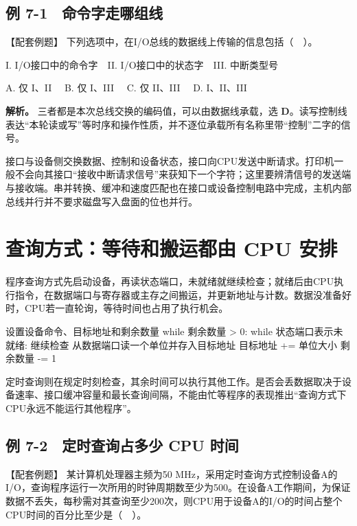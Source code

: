 \subsection{例 7-1　命令字走哪组线}\label{CO07-example-1}

【配套例题】 下列选项中，在I/O总线的数据线上传输的信息包括（　）。

I. I/O接口中的命令字　II. I/O接口中的状态字　III. 中断类型号

A. 仅 I、II　 B. 仅 I、III　 C. 仅 II、III　 D. I、II、III

\textbf{解析。} 三者都是本次总线交换的编码值，可以由数据线承载，选 \textbf{D}。读写控制线表达``本轮读或写''等时序和操作性质，并不逐位承载所有名称里带``控制''二字的信号。

接口与设备侧交换数据、控制和设备状态，接口向CPU发送中断请求。打印机一般不会向其接口``接收中断请求信号''来获知下一个字符；这里要辨清信号的发送端与接收端。串并转换、缓冲和速度匹配也在接口或设备控制电路中完成，主机内部总线并行并不要求磁盘写入盘面的位也并行。

\section{查询方式：等待和搬运都由 CPU 安排}\label{CO07-query}

程序查询方式先启动设备，再读状态端口，未就绪就继续检查；就绪后由CPU执行指令，在数据端口与寄存器或主存之间搬运，并更新地址与计数。数据没准备好时，CPU若一直轮询，等待时间也占用了执行机会。

\begin{codeblock}[language={}]
设置设备命令、目标地址和剩余数量
while 剩余数量 > 0:
    while 状态端口表示未就绪:
        继续检查
    从数据端口读一个单位并存入目标地址
    目标地址 += 单位大小
    剩余数量 -= 1
\end{codeblock}

定时查询则在规定时刻检查，其余时间可以执行其他工作。是否会丢数据取决于设备速率、接口缓冲容量和最长查询间隔，不能由忙等程序的表现推出``查询方式下CPU永远不能运行其他程序''。

\subsection{例 7-2　定时查询占多少 CPU 时间}\label{CO07-example-2}

【配套例题】 某计算机处理器主频为50 MHz，采用定时查询方式控制设备A的I/O，查询程序运行一次所用的时钟周期数至少为500。在设备A工作期间，为保证数据不丢失，每秒需对其查询至少200次，则CPU用于设备A的I/O的时间占整个CPU时间的百分比至少是（　）。

